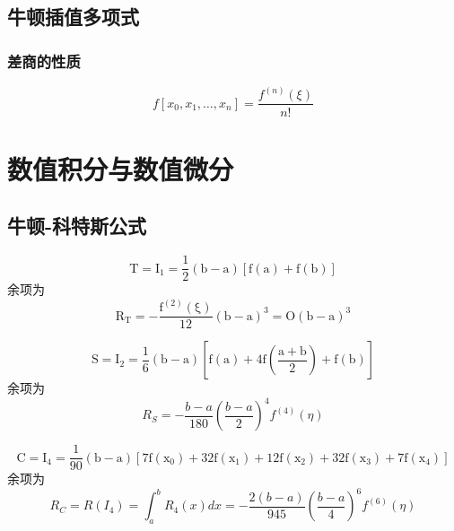 \documentclass[lang=cn,14pt]{elegantbook}
\begin{document}
	\section{牛顿插值多项式}
	\subsection{差商的性质}
	\begin{theorem}[n阶均差与导数的关系]
		\begin{equation*}
			f[x_{0},x_{1},\ldots,x_{n}]=\frac{f^{(n)}(\xi)}{n!}
		\end{equation*}
	\end{theorem}
	\chapter{数值积分与数值微分}
	\section{牛顿-科特斯公式}
	\begin{definition}
		\begin{equation*}
			\mathrm{T=I_1=\frac12(b-a)[f(a)+f(b)]}
		\end{equation*}
		余项为
		\begin{equation*}
			\mathrm{R_T=-\frac{f^{(2)}(\xi)}{12}(b-a)^3=O(b-a)^3}
		\end{equation*}
	\end{definition}
	\begin{definition}
		\begin{equation*}
			\mathrm{S=I_2=\frac16(b-a)[f(a)+4f(\frac{a+b}2)+f(b)]}
		\end{equation*}
		余项为
		\begin{equation*}
			R_S =-\frac{b-a}{180}(\frac{b-a}2)^4f^{(4)}(\eta)
		\end{equation*}
	\end{definition}
	\begin{definition}
		\begin{equation*}
			\mathrm{C=I_4=\frac1{90}(b-a)[7f(x_0)+32f(x_1)+12f(x_2)+32f(x_3)+7f(x_4)]}
		\end{equation*}
		余项为
		\begin{equation*}
			R_C=R(I_4)=\int_a^bR_4(x)dx=-\frac{2(b-a)}{945}(\frac{b-a}4)^6f^{(6)}(\eta)
		\end{equation*}
	\end{definition}
\end{document}
